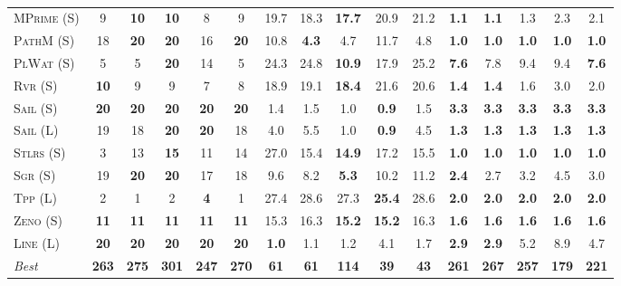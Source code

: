 \documentclass[11pt,landscape]{article}
\begin{document}
\begin{table*}[tb]
{\begin{tabular}{|l||ccccc||ccccc||ccccc||}
\textsc{MPrime} (S)&9&\textbf{10}&\textbf{10}&8&9&19.7&18.3&\textbf{17.7}&20.9&21.2&\textbf{1.1}&\textbf{1.1}&1.3&2.3&2.1\\
\textsc{PathM} (S)&18&\textbf{20}&\textbf{20}&16&\textbf{20}&10.8&\textbf{4.3}&4.7&11.7&4.8&\textbf{1.0}&\textbf{1.0}&\textbf{1.0}&\textbf{1.0}&\textbf{1.0}\\
\textsc{PlWat} (S)&5&5&\textbf{20}&14&5&24.3&24.8&\textbf{10.9}&17.9&25.2&\textbf{7.6}&7.8&9.4&9.4&\textbf{7.6}\\
\textsc{Rvr} (S)&\textbf{10}&9&9&7&8&18.9&19.1&\textbf{18.4}&21.6&20.6&\textbf{1.4}&\textbf{1.4}&1.6&3.0&2.0\\
\textsc{Sail} (S)&\textbf{20}&\textbf{20}&\textbf{20}&\textbf{20}&\textbf{20}&1.4&1.5&1.0&\textbf{0.9}&1.5&\textbf{3.3}&\textbf{3.3}&\textbf{3.3}&\textbf{3.3}&\textbf{3.3}\\
\textsc{Sail} (L)&19&18&\textbf{20}&\textbf{20}&18&4.0&5.5&1.0&\textbf{0.9}&4.5&\textbf{1.3}&\textbf{1.3}&\textbf{1.3}&\textbf{1.3}&\textbf{1.3}\\
\textsc{Stlrs} (S)&3&13&\textbf{15}&11&14&27.0&15.4&\textbf{14.9}&17.2&15.5&\textbf{1.0}&\textbf{1.0}&\textbf{1.0}&\textbf{1.0}&\textbf{1.0}\\
\textsc{Sgr} (S)&19&\textbf{20}&\textbf{20}&17&18&9.6&8.2&\textbf{5.3}&10.2&11.2&\textbf{2.4}&2.7&3.2&4.5&3.0\\
\textsc{Tpp} (L)&2&1&2&\textbf{4}&1&27.4&28.6&27.3&\textbf{25.4}&28.6&\textbf{2.0}&\textbf{2.0}&\textbf{2.0}&\textbf{2.0}&\textbf{2.0}\\
\textsc{Zeno} (S)&\textbf{11}&\textbf{11}&\textbf{11}&\textbf{11}&\textbf{11}&15.3&16.3&\textbf{15.2}&\textbf{15.2}&16.3&\textbf{1.6}&\textbf{1.6}&\textbf{1.6}&\textbf{1.6}&\textbf{1.6}\\
\textsc{Line} (L)&\textbf{20}&\textbf{20}&\textbf{20}&\textbf{20}&\textbf{20}&\textbf{1.0}&1.1&1.2&4.1&1.7&\textbf{2.9}&\textbf{2.9}&5.2&8.9&4.7
\\\hline
\textit{Best}&\textbf{263}&\textbf{275}&\textbf{301}&\textbf{247}&\textbf{270}&\textbf{61}&\textbf{61}&\textbf{114}&\textbf{39}&\textbf{43}&\textbf{261}&\textbf{267}&\textbf{257}&\textbf{179}&\textbf{221}\\\hline

        \end{tabular}}
        \caption{}
        \label{tab:all-patty}
        \end{table*}
        
\end{document}
